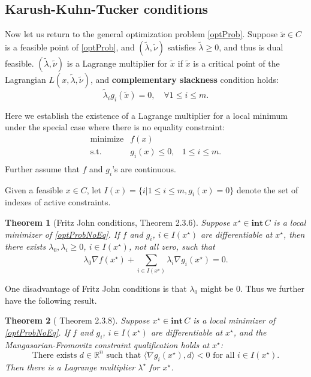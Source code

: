 \documentclass[openany]{book}
\newtheorem{theorem}{Theorem}[chapter]
\theoremstyle{definition}
\theoremstyle{remark}
\begin{document}
\subsection{Karush-Kuhn-Tucker conditions}
Now let us return to the general optimization problem \eqref{optProb}. Suppose $\tilde{x}\in C$ is a feasible point of \eqref{optProb}, and $(\tilde{\lambda},\tilde{\nu})$ satisfies $\tilde{\lambda}\ge0$, and thus is dual feasible. $(\tilde{\lambda},\tilde{\nu})$ is a Lagrange multiplier for $\tilde{x}$ if $\tilde{x}$ is a critical point of the Lagrangian $L(x,\tilde{\lambda},\tilde{\nu})$, and \textbf{complementary slackness} condition holds:
\begin{equation}\label{complSlack}
\tilde{\lambda}_ig_i(\tilde{x})=0,\quad\forall1\le i\le m.
\end{equation}

Here we establish the existence of a Lagrange multiplier for a local minimum under the special case where there is no equality constraint:
\begin{equation}\label{optProbNoEq}
    \begin{array}{lll}
    \mathrm{minimize} & f(x) & \\
    \mathrm{s.t.} & g_i(x)\le0, & 1\le i\le m. \\
    \end{array}
\end{equation}
Further assume that $f$ and $g_i$'s are continuous.

Given a feasible $x\in C$, let $I(x)=\{i|1\le i\le m,g_i(x)=0\}$ denote the set of indexes of active constraints.
\begin{theorem}[Fritz John conditions, \cite{BL10} Theorem 2.3.6]
    Suppose $x^{\star}\in \mathbf{int}\,C$ is a local minimizer of \eqref{optProbNoEq}. If $f$ and $g_i$, $i\in I(x^{\star})$ are differentiable at $x^{\star}$, then there exists $\lambda_0,\lambda_i\ge0$, $i\in I(x^{\star})$, not all zero, such that
    \begin{equation}
        \lambda_0\nabla f(x^{\star})+\sum_{i\in I(x^{\star})}^{}\lambda_i\nabla g_i(x^{\star})=0.
    \end{equation}
\end{theorem}

One disadvantage of Fritz John conditions is that $\lambda_0$ might be $0$. Thus we further have the following result.
\begin{theorem}[\cite{BL10} Theorem 2.3.8]
    Suppose $x^{\star}\in \mathbf{int}\,C$ is a local minimizer of \eqref{optProbNoEq}. If $f$ and $g_i$, $i\in I(x^{\star})$ are differentiable at $x^{\star}$, and the Mangasarian-Fromovitz constraint qualification holds at $x^{\star}$:
    \begin{equation*}
        \textrm{There exists }d\in \mathbb{R}^n\textrm{ such that }\langle\nabla g_i(x^{\star}),d\rangle<0\textrm{ for all }i\in I(x^{\star}).
    \end{equation*}
    Then there is a Lagrange multiplier $\lambda^{\star}$ for $x^{\star}$.
\end{theorem}
\end{document}
